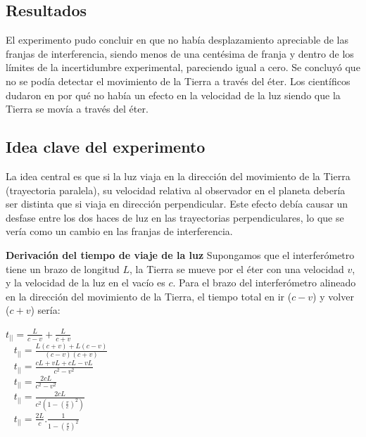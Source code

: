 \documentclass[a4paper]{article}
\begin{document}
		\subsection{Resultados}
		\indent El experimento pudo concluir en que no había desplazamiento apreciable de las franjas de interferencia, siendo menos de una centésima de franja y dentro de los límites de la incertidumbre experimental, pareciendo igual a cero. Se concluyó que no se podía detectar el movimiento de la Tierra a través del éter.
		\indent Los científicos dudaron en por qué no había un efecto en la velocidad de la luz siendo que la Tierra se movía a través del éter.
		
		\subsection{Idea clave del experimento}
		\indent La idea central es que si la luz viaja en la dirección del movimiento de la Tierra (trayectoria paralela), su velocidad relativa al observador en el planeta debería ser distinta que si viaja en dirección perpendicular. \newline
		\indent Este efecto debía causar un desfase entre los dos haces de luz en las trayectorias perpendiculares, lo que se vería como un cambio en las franjas de interferencia.\newline
		
		\textbf{Derivación del tiempo de viaje de la luz} \newline
		\indent Supongamos que el interferómetro tiene un brazo de longitud $L$, la Tierra se mueve por el éter con una velocidad $v$, y la velocidad de la luz en el vacío es $c$. \newline
		\indent Para el brazo del interferómetro alineado en la dirección del movimiento de la Tierra, el tiempo total en ir ($c-v$) y volver ($c+v$) sería:
		
		\begin{center}
			${t_{||}} = {\frac{L}{c-v}} + {\frac{L}{c+v}}$ \\ \
			\newline
			${t_{||}} = \frac{L(c+v) + L(c-v)}{(c-v)(c+v)}$ \\ \
			\newline
			${t_{||}} = \frac{cL + vL + cL - vL}{c^2 - v^2}$ \\ \
			\newline
			${t_{||}} = \frac{2cL}{c^2 - v^2}$ \\ \
			\newline
			${t_{||}} = \frac{2cL} {c^2(1 - (\frac{v}{c})^2)}$ \\ \
			\newline
			${t_{||}} = {\frac{2L}{c}} . \frac {1}{1- (\frac{v}{c})^2}$ \\ \
		\end{center}
		
\end{document}
